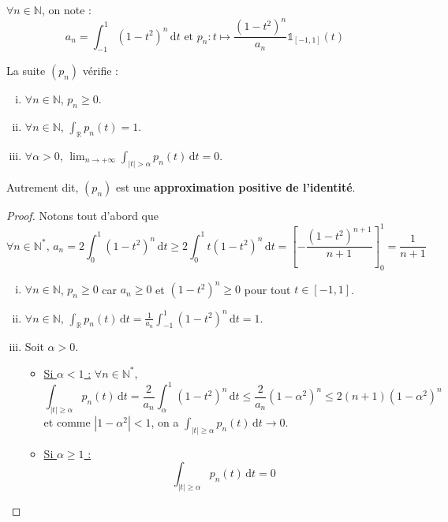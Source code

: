 






	\begin{notation}
		$\forall n \in \mathbb{N}$, on note :
		\[ a_n = \int_{-1}^1 (1-t^2)^n \, \mathrm{d}t \text{ et } p_n : t \mapsto \frac{(1-t^2)^n}{a_n} \mathbb{1}_{[-1, 1]}(t) \]
	\end{notation}

	\begin{lemma}
		\label{theoreme-de-weierstrass-par-la-convolution-1}
		La suite $(p_n)$ vérifie :
		\begin{enumerate}[(i)]
			\item $\forall n \in \mathbb{N}$, $p_n \geq 0$.
			\item $\forall n \in \mathbb{N}$, $\int_{\mathbb{R}} p_n(t) = 1$.
			\item $\forall \alpha > 0$, $\lim_{n \rightarrow +\infty} \int_{|t| > \alpha} p_n(t) \, \mathrm{d}t = 0$.
		\end{enumerate}
		Autrement dit, $(p_n)$ est une \textbf{approximation positive de l'identité}.
	\end{lemma}

	\begin{proof}
		Notons tout d'abord que
		\[ \forall n \in \mathbb{N}^*, \, a_n = 2 \int_0^1 (1-t^2)^n \, \mathrm{d}t \geq 2 \int_0^1 t (1-t^2)^n \, \mathrm{d}t = \left[ - \frac{(1-t^2)^{n+1}}{n+1} \right]_0^1 = \frac{1}{n+1}  \]
		\begin{enumerate}[(i)]
			\item $\forall n \in \mathbb{N}$, $p_n \geq 0$ car $a_n \geq 0$ et $(1-t^2)^n \geq 0$ pour tout $t \in [-1, 1]$.
			\item $\forall n \in \mathbb{N}$, $\int_{\mathbb{R}} p_n(t) \, \mathrm{d}t = \frac{1}{a_n} \int_{-1}^1 (1-t^2)^n \, \mathrm{d}t = 1$.
			\item Soit $\alpha > 0$.
			\begin{itemize}
				\item \uline{Si $\alpha < 1$ :} $\forall n \in \mathbb{N}^*$,
				\[ \int_{|t| \geq \alpha} p_n(t) \, \mathrm{d}t = \frac{2}{a_n} \int_\alpha^1 (1-t^2)^n \, \mathrm{d}t \leq \frac{2}{a_n} (1-\alpha^2)^n \leq 2(n+1)(1-\alpha^2)^n \]
				et comme $|1-\alpha^2| < 1$, on a $\int_{|t| \geq \alpha} p_n(t) \, \mathrm{d}t \longrightarrow 0$.
				\item \uline{Si $\alpha \geq 1$ :}
				\[ \int_{|t| \geq \alpha} p_n(t) \, \mathrm{d}t = 0 \]
			\end{itemize}
		\end{enumerate}
	\end{proof}

